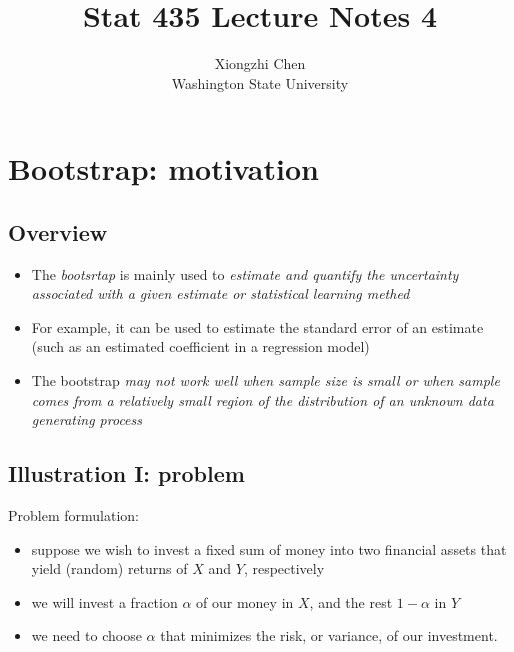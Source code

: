 \documentclass[]{article}
\title{Stat 435 Lecture Notes 4}
\author{Xiongzhi Chen \\ Washington State University}
\date{}
\providecommand{\tightlist}{%
  \setlength{\itemsep}{0pt}\setlength{\parskip}{0pt}}
\begin{document}
\maketitle

{
\setcounter{tocdepth}{2}
\tableofcontents
}
\section{}\label{section}

\section{Bootstrap: motivation}\label{bootstrap-motivation}

\subsection{Overview}\label{overview}

\begin{itemize}
\item
  The \emph{bootsrtap} is mainly used to \emph{estimate and quantify the
  uncertainty associated with a given estimate or statistical learning
  methed}
\item
  For example, it can be used to estimate the standard error of an
  estimate (such as an estimated coefficient in a regression model)
\item
  The bootstrap \emph{may not work well when sample size is small or
  when sample comes from a relatively small region of the distribution
  of an unknown data generating process}
\end{itemize}

\subsection{Illustration I: problem}\label{illustration-i-problem}

Problem formulation:

\begin{itemize}
\tightlist
\item
  suppose we wish to invest a fixed sum of money into two financial
  assets that yield (random) returns of \(X\) and \(Y\), respectively
\item
  we will invest a fraction \(\alpha\) of our money in \(X\), and the
  rest \(1-\alpha\) in \(Y\)
\item
  we need to choose \(\alpha\) that minimizes the risk, or variance, of
  our investment.
\end{itemize}
\end{document}
